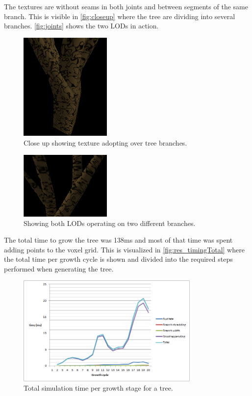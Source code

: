 \documentclass[11pt]{article} %
\begin{document}
The textures are without seams in both joints and between segments of the same branch.
This is visible in \autoref{fig:closeup} where the tree are dividing into several branches.
\autoref{fig:joints} shows the two LODs in action.

\begin{figure}[htp]
	\centering
	\includegraphics[width=0.4\textwidth]{joints.png}
	\caption{Close up showing texture adopting over tree branches.}
	\label{fig:closeup}
\end{figure}

\begin{figure}[htp]
	\centering
	\includegraphics[width=0.4\textwidth]{closeup.png}
	\caption{Showing both LODs operating on two different branches.}
	\label{fig:joints}
\end{figure}

The total time to grow the tree was 138ms and most of that time was spent adding points to the voxel grid.
This is visualized in \autoref{fig:res_timingTotal} where the total time per growth cycle is shown and divided into the required steps performed when generating the tree.

\begin{figure}[htp]
	\centering
	\includegraphics[width=0.8\textwidth]{timingTotal.png}
	\caption{Total simulation time per growth stage for a tree.}
	\label{fig:res_timingTotal}
\end{figure}
\end{document}
